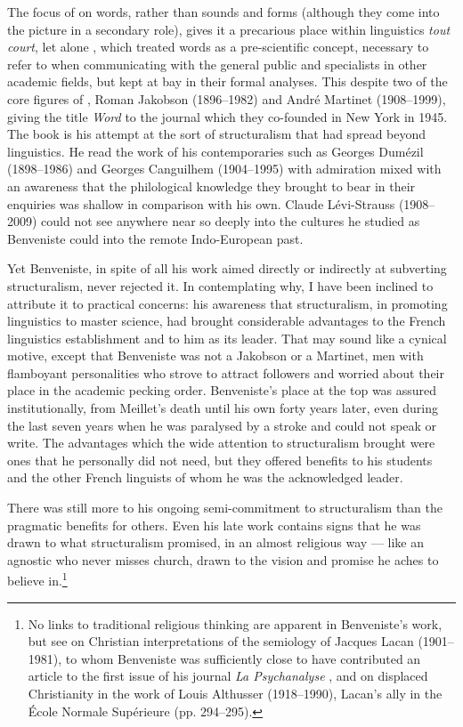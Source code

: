 \documentclass[output=paper]{langscibook}
\begin{document}
The focus of \citet{Benveniste1969vocabulaire} on words, rather than sounds and forms (although they come into the picture in a secondary role), gives it a precarious place within linguistics \emph{tout court}, let alone , which treated words as a pre-scientific concept, necessary to refer to when communicating with the general public and specialists in other academic fields, but kept at bay in their formal analyses. This despite two of the core figures of , Roman Jakobson (1896--1982) and André Martinet (1908--1999), giving the title \emph{Word} to the journal which they co-founded in New York in 1945. The \citeyear{Benveniste1969vocabulaire} book is his attempt at the sort of structuralism that had spread beyond linguistics. He read the work of his contemporaries such as Georges Dumézil (1898--1986) and Georges Canguilhem (1904--1995) with admiration mixed with an awareness that the philological knowledge they brought to bear in their enquiries was shallow in comparison with his own. Claude Lévi-Strauss (1908--2009) could not see anywhere near so deeply into the cultures he studied as Benveniste could into the remote Indo-European past.

Yet Benveniste, in spite of all his work aimed directly or indirectly at subverting structuralism, never rejected it. In contemplating why, I have been inclined to attribute it to practical concerns: his awareness that structuralism, in promoting linguistics to master science, had brought considerable advantages to the French linguistics establishment and to him as its leader. That may sound like a cynical motive, except that Benveniste was not a Jakobson or a Martinet, men with flamboyant personalities who strove to attract followers and worried about their place in the academic pecking order. Benveniste's place at the top was assured institutionally, from Meillet's death until his own forty years later, even during the last seven years when he was paralysed by a stroke and could not speak or write. The advantages which the wide attention to structuralism brought were ones that he personally did not need, but they offered benefits to his students and the other French linguists of whom he was the acknowledged leader.

There was still more to his ongoing semi-commitment to structuralism than the pragmatic benefits for others. Even his late work contains signs that he was drawn to what structuralism promised, in an almost religious way — like an agnostic who never misses church, drawn to the vision and promise he aches to believe in.\footnote{No links to traditional religious thinking are apparent in Benveniste's work, but see \citet[245--247]{Dosse1997} on Christian interpretations of the semiology of Jacques Lacan (1901--1981), to whom Benveniste was sufficiently close to have contributed an article to the first issue of his journal \emph{La Psychanalyse} \citep{Benveniste1956remarques}, and on displaced Christianity in the work of Louis Althusser (1918--1990), Lacan's ally in the École Normale Supérieure (pp. 294--295).}
\end{document}
